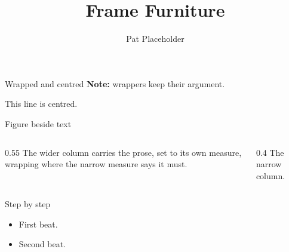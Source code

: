 \documentclass[aspectratio=169]{beamer}
\title{Frame Furniture}
\author{Pat Placeholder}
\date{}
\newenvironment{callout}[1]{\textbf{#1:} }{}
\begin{document}
\maketitle

\begin{frame}{Wrapped and centred}
\begin{callout}{Note}
wrappers keep their argument.
\end{callout}

{\centering This line is centred.\par}
\end{frame}

\begin{frame}{Figure beside text}
\begin{columns}[T]
\begin{column}{0.55\textwidth}
The wider column carries the prose, set to its own measure, wrapping
where the narrow measure says it must.
\end{column}
\begin{column}{0.4\textwidth}
\centering
The narrow column.
\end{column}
\end{columns}
\end{frame}

\begin{frame}{Step by step}
\begin{itemize}
\item<1-> First beat.
\item<2-> Second beat.
\end{itemize}

\pause
{}
\end{frame}
\end{document}
